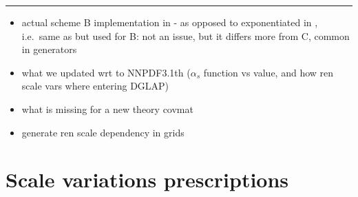 \vspace*{20pt}
\noindent
\rule{\hsize}{1pt}

\begin{itemize}
	\item actual scheme B implementation in \eko - as opposed to exponentiated
		in \apfel, i.e.\ same as \pegasus but used for B: not an issue, but it
		differs more from C, common in \mc generators
	\item what we updated wrt to NNPDF3.1th ($\alpha_s$ function vs value, and
		how ren scale vars where entering DGLAP)
	\item what is missing for a new theory covmat
	\item generate ren scale dependency in grids
\end{itemize}

\section{Scale variations prescriptions}
\label{sec:mhou/prescriptions}

